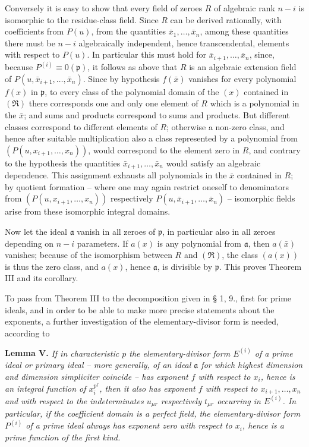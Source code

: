 \documentclass[11pt]{article}
\providecommand{\mR}{\mathfrak{R}}
\providecommand{\frakp}{\mathfrak p}
\providecommand{\fraka}{\mathfrak a}
\providecommand{\mR}{\mathfrak{R}}
\providecommand{\fraka}{\mathfrak a}
\providecommand{\frakp}{\mathfrak p}
\providecommand{\frakp}{\mathfrak p}
\begin{document}
Conversely it is easy to show that every field of zeroes $R$ of algebraic rank $n-i$ is isomorphic to the residue-class field. Since $R$ can be derived rationally, with coefficients from $P(u)$, from the quantities $\bar{x}_1,\ldots,\bar{x}_n$, among these quantities there must be $n-i$ algebraically independent, hence transcendental, elements with respect to $P(u)$. In particular this must hold for $\bar{x}_{i+1},\ldots,\bar{x}_n$, since, because $P^{(i)}\equiv0(\frakp)$, it follows as above that $R$ is an algebraic extension field of $P(u,\bar{x}_{i+1},\ldots,\bar{x}_n)$. Since by hypothesis $f(\bar{x})$ vanishes for every polynomial $f(x)$ in $\frakp$, to every class of the polynomial domain of the $(x)$ contained in $(\mR)$ there corresponds one and only one element of $R$ which is a polynomial in the $\bar{x}$; and sums and products correspond to sums and products. But different classes correspond to different elements of $R$; otherwise a non-zero class, and hence after suitable multiplication also a class represented by a polynomial from $(P(u,x_{i+1},\ldots,x_n))$, would correspond to the element zero in $R$, and contrary to the hypothesis the quantities $\bar{x}_{i+1},\ldots,\bar{x}_n$ would satisfy an algebraic dependence. This assignment exhausts all polynomials in the $\bar{x}$ contained in $R$; by quotient formation -- where one may again restrict oneself to denominators from $(P(u,x_{i+1},\ldots,x_n))$ respectively $P(u,\bar{x}_{i+1},\ldots,\bar{x}_n)$ -- isomorphic fields arise from these isomorphic integral domains.

Now let the ideal $\fraka$ vanish in all zeroes of $\frakp$, in particular also in all zeroes depending on $n-i$ parameters. If $a(x)$ is any polynomial from $\fraka$, then $a(\bar{x})$ vanishes; because of the isomorphism between $R$ and $(\mR)$, the class $(a(x))$ is thus the zero class, and $a(x)$, hence $\fraka$, is divisible by $\frakp$. This proves Theorem III and its corollary.

To pass from Theorem III to the decomposition given in § 1, 9., first for prime ideals, and in order to be able to make more precise statements about the exponents, a further investigation of the elementary-divisor form is needed, according to

\textbf{Lemma V.} \emph{If in characteristic $p$ the elementary-divisor form $E^{(i)}$ of a prime ideal or primary ideal -- more generally, of an ideal $\fraka$ for which highest dimension and dimension simpliciter coincide -- has exponent $f$ with respect to $x_i$, hence is an integral function of $x_i^{p^f}$, then it also has exponent $f$ with respect to $x_{i+1},\ldots,x_n$ and with respect to the indeterminates $u_{\mu r}$ respectively $t_{\mu r}$ occurring in $E^{(i)}$. In particular, if the coefficient domain is a perfect field, the elementary-divisor form $P^{(i)}$ of a prime ideal always has exponent zero with respect to $x_i$, hence is a prime function of the first kind.}
\end{document}
